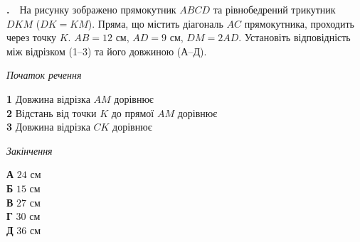 \documentclass[12pt]{article}
\newcounter{zad}
\newcommand{\zadnum}{\stepcounter{zad}\textbf{\thezad.}\ \ }
\begin{document}
\hypertarget{task:76}{}\par\vspace{0.05cm}\noindent\hyperlink{sol:76}{}\par\vspace{0.2cm}
\vspace{0.7cm}
\zadnum На рисунку зображено прямокутник $ABCD$ та рівнобедрений трикутник $DKM$ ($DK = KM$). Пряма, що містить діагональ $AC$ прямокутника, проходить через точку $K$. $AB = 12$ см, $AD = 9$ см, $DM = 2AD$. Установіть відповідність між відрізком (1--3) та його довжиною (А--Д).
\vspace{0.3cm}
\begin{center}
\end{center}
\vspace{0.2cm}
\noindent
\begin{minipage}[t]{0.46\textwidth}
\textit{Початок речення}\par\vspace{0.2cm}
\textbf{1} \quad Довжина відрізка $AM$ дорівнює\\[0.2cm]
\textbf{2} \quad Відстань від точки $K$ до прямої $AM$ дорівнює\\[0.2cm]
\textbf{3} \quad Довжина відрізка $CK$ дорівнює
\end{minipage}
\hfill
\begin{minipage}[t]{0.28\textwidth}
\textit{Закінчення}\par\vspace{0.2cm}
\textbf{А} \quad $24$ см\\[0.15cm]
\textbf{Б} \quad $15$ см\\[0.15cm]
\textbf{В} \quad $27$ см\\[0.15cm]
\textbf{Г} \quad $30$ см\\[0.15cm]
\textbf{Д} \quad $36$ см
\end{minipage}
\end{document}
